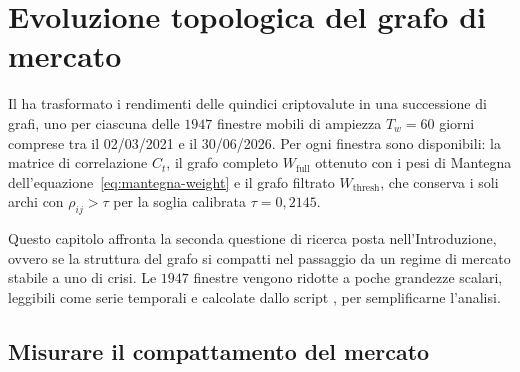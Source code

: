 \chapter{Evoluzione topologica del grafo di mercato}
\label{ch:topological-evolution}

Il  ha trasformato i rendimenti delle quindici criptovalute in una successione di grafi, uno per ciascuna delle $1947$ finestre mobili di ampiezza $T_w=60$ giorni comprese tra il 02/03/2021 e il 30/06/2026. Per ogni finestra sono disponibili: la matrice di correlazione $C_t$, il grafo completo $W_{\mathrm{full}}$ ottenuto con i pesi di Mantegna dell'equazione~\eqref{eq:mantegna-weight} e il grafo filtrato $W_{\mathrm{thresh}}$, che conserva i soli archi con $\rho_{ij}>\tau$ per la soglia calibrata $\tau=0{,}2145$.

Questo capitolo affronta la seconda questione di ricerca posta nell'Introduzione, ovvero se la struttura del grafo si compatti nel passaggio da un regime di mercato stabile a uno di crisi. Le $1947$ finestre vengono ridotte a poche grandezze scalari, leggibili come serie temporali e calcolate dallo script , per semplificarne l'analisi.

\section{Misurare il compattamento del mercato}
\label{sec:topo-measuring-compaction}

